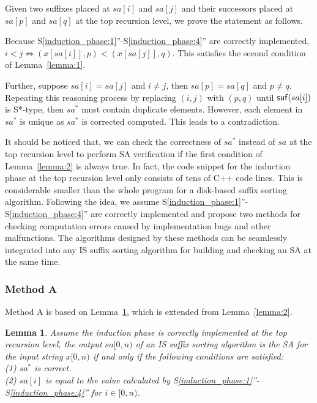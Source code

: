 \documentclass[10pt,journal,compsoc]{IEEEtran}
\newtheorem{lemma}[theorem]{Lemma}
\begin{document}
\begin{IEEEproof} Given two suffixes placed at $sa[i]$ and $sa[j]$ and their successors placed at $sa[p]$ and $sa[q]$ at the top recursion level, we prove the statement as follows.

Because S\ref{induction_phase:1}''-S\ref{induction_phase:4}'' are correctly implemented, $i < j \iff (x[sa[i]], p) < (x[sa[j]], q)$. This satisfies the second condition of Lemma~\ref{lemma:1}.

Further, suppose $sa[i] = sa[j]$ and $i \ne j$, then $sa[p] = sa[q]$ and $p \ne q$. Repeating this reasoning process by replacing $(i, j)$ with $(p, q)$ until ${\sf suf}(sa[i])$ is S*-type, then $sa^*$ must contain duplicate elements. However, each element in $sa^*$ is unique as $sa^*$ is corrected computed. This leads to a contradiction.

\end{IEEEproof}

It should be noticed that, we can check the correctness of $sa^*$ instead of $sa$ at the top recursion level to perform SA verification if the first condition of Lemma~\ref{lemma:2} is always true. In fact, the code snippet for the induction phase at the top recursion level only consists of tens of C++ code lines. This is considerable smaller than the whole program for a disk-based suffix sorting algorithm. Following the idea, we assume S\ref{induction_phase:1}''-S\ref{induction_phase:4}'' are correctly implemented and propose two methods for checking computation errors caused by implementation bugs and other malfunctions. The algorithms designed by these methods can be seamlessly integrated into any IS suffix sorting algorithm for building and checking an SA at the same time.

\subsubsection{Method A} \label{sec:proposals:method_a}

Method A is based on Lemma~\ref{lemma:3}, which is extended from Lemma~\ref{lemma:2}.

\begin{lemma} \label{lemma:3}
	Assume the induction phase is correctly implemented at the top recursion level, the output $sa[0, n)$ of an IS suffix sorting algorithm is the SA for the input string $x[0, n)$ if and only if the following conditions are satisfied: \\
	(1) $sa^*$ is correct. \\
	(2) $sa[i]$ is equal to the value calculated by S\ref{induction_phase:1}''-S\ref{induction_phase:4}'' for $i \in [0, n)$. \\
	
\end{lemma}
\end{document}
